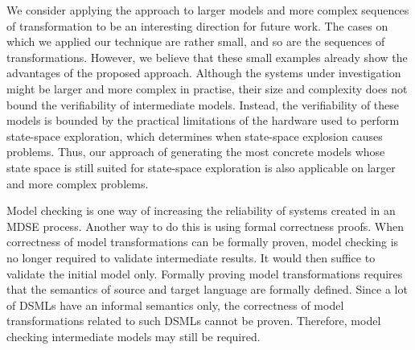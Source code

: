 We consider applying the approach to larger models and more complex sequences of transformation to be an interesting direction for future work.
The cases on which we applied our technique are rather small, and so are the sequences of transformations.
However, we believe that these small examples already show the advantages of the proposed approach.
Although the systems under investigation might be larger and more complex in practise, their size and complexity does not bound the verifiability of intermediate models.
Instead, the verifiability of these models is bounded by the practical limitations of the hardware used to perform state-space exploration, which determines when state-space explosion causes problems.
Thus, our approach of generating the most concrete models whose state space is still suited for state-space exploration is also applicable on larger and more complex problems.

Model checking is one way of increasing the reliability of systems created in an MDSE process.
Another way to do this is using formal correctness proofs.
When correctness of model transformations can be formally proven, model checking is no longer required to validate intermediate results.
It would then suffice to validate the initial model only.
Formally proving model transformations requires that the semantics of source and target language are formally defined.
Since a lot of DSMLs have an informal semantics only, the correctness of model transformations related to such DSMLs cannot be proven.
Therefore, model checking intermediate models may still be required. 